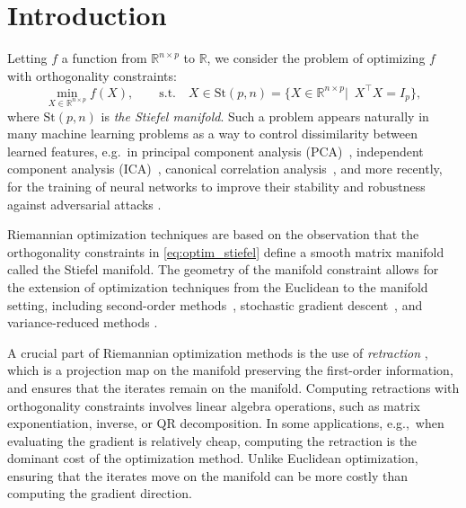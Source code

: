 \documentclass[twoside,11pt]{article}
\newcommand{\stiefel}{{\mathrm{St}(p, n)}}
\newcommand{\bR}{\mathbb{R}}    %
\begin{document}
%

%


\section{Introduction}

Letting $f$ a function from $\mathbb{R}^{n\times p}$ to $\mathbb{R}$, we consider the problem of optimizing $f$ with orthogonality constraints:
\begin{equation}
    \min_{X\in\bR^{n\times p}} f(X), \qquad \text{s.t.}\quad X \in \stiefel = \{X\in\mathbb{R}^{n\times p}|\enspace X^\top X = I_p \}, \label{eq:optim_stiefel}
\end{equation}
where $\stiefel$ is \emph{the Stiefel manifold}.
Such a problem appears naturally in many machine learning problems as a way to control dissimilarity between learned features, e.g.~in principal component analysis (PCA)~\citep{hotelling1933analysis}, independent component analysis (ICA)~\citep{hyvarinen1999fast,TheCasAbs2009,ablin2018faster}, canonical correlation analysis~\citep{hotelling1936relations}, and more recently, for the training of neural networks to improve their stability \citep{arjovsky2015unitary, zhang2021orthogonality, wang2020orthogonal} and robustness against adversarial attacks \citep{cisse2017parseval, li2019orthogonal, li2019preventing, singla2021skew}. %

%
%
%

Riemannian optimization techniques are based on the observation that the orthogonality constraints in \eqref{eq:optim_stiefel} define a smooth matrix manifold \citep{absil2008optimization, boumal2023introduction} called the Stiefel manifold. The geometry of the manifold constraint allows for the extension of optimization techniques from the Euclidean to the manifold setting, including second-order methods~\citep{absil2007trust}, stochastic gradient descent~\citep{bonnabel2013stochastic}, and variance-reduced methods \citep{zhang2016riemannian, tripuraneni2018averaging, zhou2019faster}. 

A crucial part of Riemannian optimization methods is the use of \emph{retraction} \citep{ADM2002, absil2012projection}, which is a projection map on the manifold preserving the first-order information, and ensures that the iterates remain on the manifold. Computing retractions with orthogonality constraints involves linear algebra operations, such as matrix exponentiation, inverse, or QR decomposition. In some applications, e.g.,~when evaluating the gradient is relatively cheap, computing the retraction is the dominant cost of the optimization method. 
Unlike Euclidean optimization, ensuring that the iterates move on the manifold can be more costly than computing the gradient direction.
\end{document}
